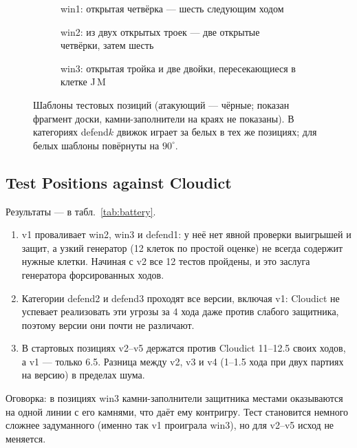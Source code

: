 \documentclass[a4paper,10pt,twocolumn]{article}
\newenvironment{points}{\begin{enumerate}[label=(\arabic*),leftmargin=*,itemsep=2pt,topsep=3pt]}{\end{enumerate}}
\newcommand{\board}[4]{%
  \fill[board] (#1-0.6,-#3+0.6) rectangle (#2+0.6,-#4-0.6);
  \foreach \c in {#1,...,#2} {\draw[black!60,line width=0.3pt] (\c,-#3) -- (\c,-#4);
     \node[font=\tiny\ttfamily,above] at (\c,-#3+0.45) {\pgfmathparse{int(\c+64)}\char\pgfmathresult};}
  \foreach \r in {#3,...,#4} {\draw[black!60,line width=0.3pt] (#1,-\r) -- (#2,-\r);
     \node[font=\tiny\ttfamily,left] at (#1-0.45,-\r) {\pgfmathparse{int(\r+64)}\char\pgfmathresult};}
}
\newcommand{\B}[2]{\node[bstone] at (#1,-#2) {};}
\newcommand{\W}[2]{\node[wstone] at (#1,-#2) {};}
\begin{document}
\begin{figure}[t]
\centering
\begin{subfigure}[t]{0.32\textwidth}\centering
{}
\caption{win1: открытая четвёрка --- шесть следующим ходом}
\end{subfigure}\hfill
\begin{subfigure}[t]{0.32\textwidth}\centering
{}
\caption{win2: из двух открытых троек --- две открытые четвёрки, затем шесть}
\end{subfigure}\hfill
\begin{subfigure}[t]{0.32\textwidth}\centering
{}
\caption{win3: открытая тройка и две двойки, пересекающиеся в клетке J\,M}
\end{subfigure}
\caption{Шаблоны тестовых позиций (атакующий --- чёрные; показан фрагмент доски, камни-заполнители на краях не показаны). В категориях defend$k$ движок играет за белых в тех же позициях; для белых шаблоны повёрнуты на $90^\circ$.}
\label{fig:positions}
\end{figure}

\subsection{Test Positions against Cloudict}
Результаты --- в табл.~\ref{tab:battery}.
\begin{points}
\item v1 проваливает win2, win3 и defend1: у неё нет явной проверки выигрышей и защит, а узкий генератор (12 клеток по простой оценке) не всегда содержит нужные клетки. Начиная с v2 все 12 тестов пройдены, и это заслуга генератора форсированных ходов.
\item Категории defend2 и defend3 проходят все версии, включая v1: Cloudict не успевает реализовать эти угрозы за 4 хода даже против слабого защитника, поэтому версии они почти не различают.
\item В стартовых позициях v2--v5 держатся против Cloudict 11--12.5 своих ходов, а v1 --- только 6.5. Разница между v2, v3 и v4 (1--1.5 хода при двух партиях на версию) в пределах шума.
\end{points}
Оговорка: в позициях win3 камни-заполнители защитника местами оказываются на одной линии с его камнями, что даёт ему контригру. Тест становится немного сложнее задуманного (именно так v1 проиграла win3), но для v2--v5 исход не меняется.
\end{document}
